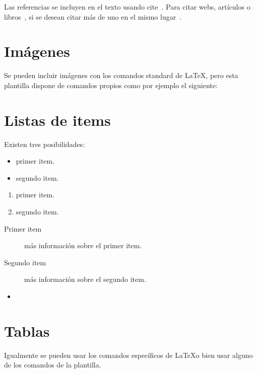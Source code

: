 Las referencias se incluyen en el texto usando cite~\cite{wiki:latex}. Para citar webs, artículos o libros~\cite{koza92}, si se desean citar más de uno en el mismo lugar~\cite{bortolot2005, koza92}.


\section{Imágenes}

Se pueden incluir imágenes con los comandos standard de \LaTeX, pero esta plantilla dispone de comandos propios como por ejemplo el siguiente:




\section{Listas de items}

Existen tres posibilidades:

\begin{itemize}
	\item primer item.
	\item segundo item.
\end{itemize}

\begin{enumerate}
	\item primer item.
	\item segundo item.
\end{enumerate}

\begin{description}
	\item[Primer item] más información sobre el primer item.
	\item[Segundo item] más información sobre el segundo item.
\end{description}
	
\begin{itemize}
\item 
\end{itemize}

\section{Tablas}

Igualmente se pueden usar los comandos específicos de \LaTeX o bien usar alguno de los comandos de la plantilla.

